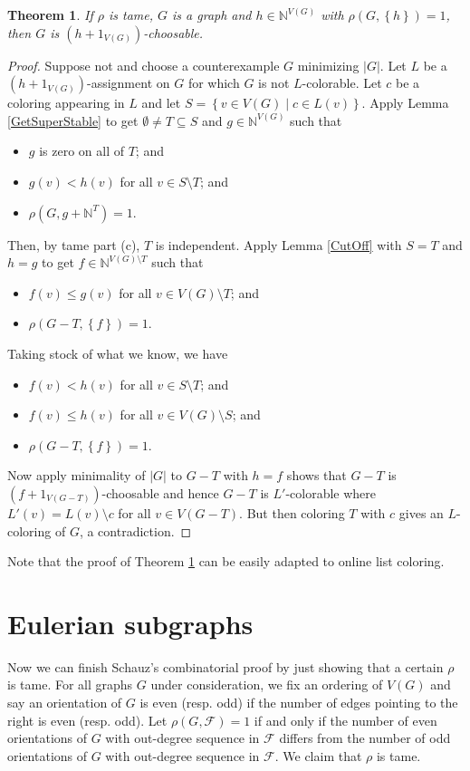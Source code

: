 \documentclass[12pt]{article}
\theoremstyle{plain}
\newtheorem{thm}{Theorem}[section]
\theoremstyle{definition}
\theoremstyle{remark}
\newcommand{\fancy}[1]{\mathcal{#1}}
\newcommand{\IN}{\mathbb{N}}
\newcommand{\set}[1]{\left\{ #1 \right\}}
\newcommand{\setb}[3]{\left\{ #1 \in #2 \mid #3 \right\}}
\newcommand{\card}[1]{\left|#1\right|}
\def\F{\fancy{F}}
\begin{document}
\begin{thm}\label{TameRhoWins}
	If $\rho$ is tame, $G$ is a graph and $h \in \IN^{V(G)}$ with $\rho(G, \set{h}) = 1$, then $G$ is $(h + 1_{V(G)})$-choosable.
\end{thm}
\begin{proof}
	Suppose not and choose a counterexample $G$ minimizing $\card{G}$.  Let $L$ be a $(h + 1_{V(G)})$-assignment on $G$ for which $G$ is not $L$-colorable.  Let $c$ be a coloring appearing in $L$ and let $S = \setb{v}{V(G)}{c \in L(v)}$.  Apply Lemma \ref{GetSuperStable} to get $\emptyset \ne T \subseteq S$ and $g \in \IN^{V(G)}$ such that
	\begin{itemize}
		\item $g$ is zero on all of $T$; and
		\item $g(v) < h(v)$ for all $v \in S\setminus T$; and
		\item $\rho(G, g + \IN^T) = 1$.
	\end{itemize}
	Then, by tame part (c), $T$ is independent.  Apply Lemma \ref{CutOff} with $S = T$ and $h = g$ to get $f \in \IN^{V(G) \setminus T}$ such that
		\begin{itemize}
			\item $f(v) \le g(v)$ for all $v \in V(G) \setminus T$; and
			\item $\rho(G - T, \set{f}) = 1$.
		\end{itemize}
	Taking stock of what we know, we have
		\begin{itemize}
			\item $f(v) < h(v)$ for all $v \in S \setminus T$; and
			\item $f(v) \le h(v)$ for all $v \in V(G) \setminus S$; and
			\item $\rho(G - T, \set{f}) = 1$.
		\end{itemize}
		
	Now apply minimality of $|G|$ to $G-T$ with $h = f$ shows that $G-T$ is $(f + 1_{V(G-T)})$-choosable and hence $G-T$ is $L'$-colorable where $L'(v) = L(v) \setminus c$ for all $v \in V(G-T)$.  But then coloring $T$ with $c$ gives an $L$-coloring of $G$, a contradiction.
\end{proof}

Note that the proof of Theorem \ref{TameRhoWins} can be easily adapted to online list coloring.

\section{Eulerian subgraphs}
Now we can finish Schauz's combinatorial proof by just showing that a certain $\rho$ is tame.  For all graphs $G$ under consideration, we fix an ordering of $V(G)$ and say an orientation of $G$ is even (resp. odd) if the number of edges pointing to the right is even (resp. odd).  Let $\rho(G, \F) = 1$ if and only if the number of even orientations of $G$ with out-degree sequence in $\F$ differs from the number of odd orientations of $G$ with out-degree sequence in $\F$.  We claim that $\rho$ is tame.  
\end{document}
